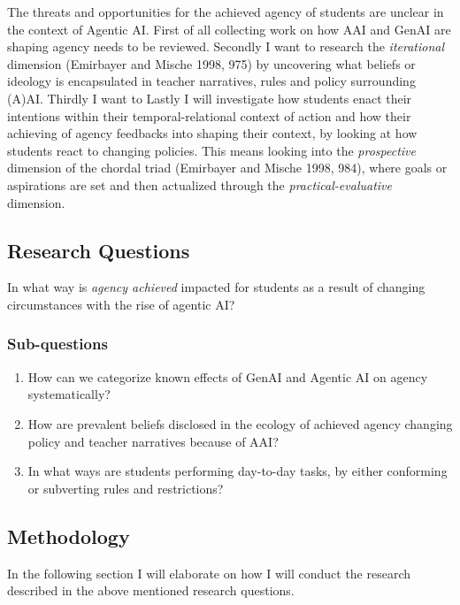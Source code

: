 \documentclass[
  letterpaper,
  DIV=11,
  numbers=noendperiod]{scrartcl}
\providecommand{\tightlist}{%
  \setlength{\itemsep}{0pt}\setlength{\parskip}{0pt}}
\begin{document}
The threats and opportunities for the achieved agency of students are
unclear in the context of Agentic AI. First of all collecting work on
how AAI and GenAI are shaping agency needs to be reviewed. Secondly I
want to research the \emph{iterational} dimension (Emirbayer and Mische
1998, 975) by uncovering what beliefs or ideology is encapsulated in
teacher narratives, rules and policy surrounding (A)AI. Thirdly I want
to Lastly I will investigate how students enact their intentions within
their temporal-relational context of action and how their achieving of
agency feedbacks into shaping their context, by looking at how students
react to changing policies. This means looking into the
\emph{prospective} dimension of the chordal triad (Emirbayer and Mische
1998, 984), where goals or aspirations are set and then actualized
through the \emph{practical-evaluative} dimension.

\subsection{Research Questions}\label{research-questions}

In what way is \emph{agency achieved} impacted for students as a result
of changing circumstances with the rise of agentic AI?

\subsubsection{Sub-questions}\label{sub-questions}

\begin{enumerate}
\def\labelenumi{\arabic{enumi}.}
\tightlist
\item
  How can we categorize known effects of GenAI and Agentic AI on agency
  systematically?
\item
  How are prevalent beliefs disclosed in the ecology of achieved agency
  changing policy and teacher narratives because of AAI?
\item
  In what ways are students performing day-to-day tasks, by either
  conforming or subverting rules and restrictions?
\end{enumerate}

\subsection{Methodology}\label{methodology}

In the following section I will elaborate on how I will conduct the
research described in the above mentioned research questions.
\end{document}
